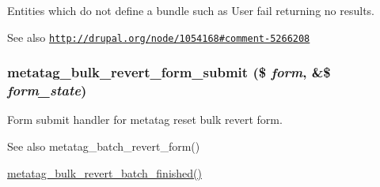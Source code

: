 Entities which do not define a bundle such as User fail returning no results. \begin{DoxySeeAlso}{See also}
\href{http://drupal.org/node/1054168#comment-5266208}{\tt http://drupal.org/node/1054168\#comment-\/5266208}
\end{DoxySeeAlso}
\hypertarget{metatag_8admin_8inc_a175595665a6d1fead2df7b214a3845d8}{
\subsubsection[{metatag\_\-bulk\_\-revert\_\-form\_\-submit}]{\setlength{\rightskip}{0pt plus 5cm}metatag\_\-bulk\_\-revert\_\-form\_\-submit (\$ {\em form}, \/  \&\$ {\em form\_\-state})}}
\label{metatag_8admin_8inc_a175595665a6d1fead2df7b214a3845d8}
Form submit handler for metatag reset bulk revert form.

\begin{DoxySeeAlso}{See also}
metatag\_\-batch\_\-revert\_\-form() 

\hyperlink{metatag_8admin_8inc_a3fae24225b7ba1a63a6317b49c147094}{metatag\_\-bulk\_\-revert\_\-batch\_\-finished()} 
\end{DoxySeeAlso}
